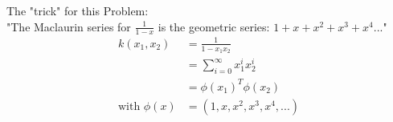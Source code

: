 %
%
%
\begin{flushleft}
The "trick" for this Problem:\\
"The Maclaurin series for $\frac{1}{1-x}$ is the geometric series:
$1 + x + x^2 + x^3 + x^4 ...$"
\begin{align*}
k(x_1,x_2)&=\frac{1}{1-x_1 x_2}\\
&= \sum_{i=0}^{\infty}x_1^i x_2^i\\
&= \phi(x_1)^T \phi(x_2)\\
\text{with } \phi(x)&=(1,x,x^2,x^3,x^4, ...)
\end{align*}
\end{flushleft}
%
%



